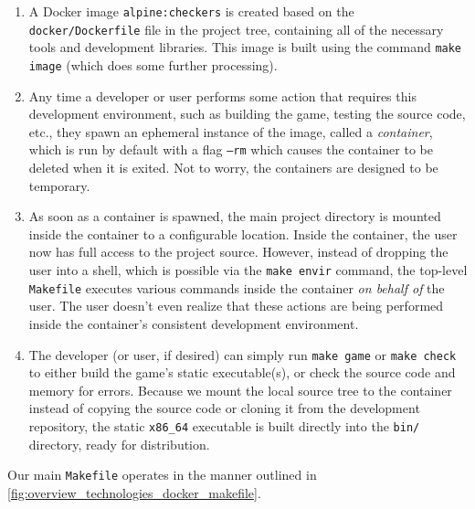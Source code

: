 \documentclass[letterpaper]{article}
\begin{document}
\begin{enumerate}
    \item A Docker image \texttt{alpine:checkers} is created
          based on the \texttt{docker/Dockerfile} file in the
          project tree, containing all of the necessary tools
          and development libraries. This image is built using
          the command \texttt{make image} (which does some
          further processing).
    \item Any time a developer or user performs some action
          that requires this development environment, such as
          building the game, testing the source code, etc.,
          they spawn an ephemeral instance of the image,
          called a \emph{container}, which is run by default
          with a flag \texttt{--rm} which causes the container
          to be deleted when it is exited. Not to worry, the
          containers are designed to be temporary.
    \item As soon as a container is spawned, the main project
          directory is mounted inside the container to a
          configurable location. Inside the container, the
          user now has full access to the project source.
          However, instead of dropping the user into a shell,
          which is possible via the \texttt{make envir}
          command, the top-level \texttt{Makefile} executes
          various commands inside the container
          \emph{on behalf of} the user. The user doesn't even
          realize that these actions are being performed inside
          the container's consistent development environment.
    \item The developer (or user, if desired) can simply run
          \texttt{make game} or \texttt{make check} to either
          build the game's static executable(s), or check the
          source code and memory for errors. Because we mount
          the local source tree to the container instead of
          copying the source code or cloning it from the
          development repository, the static \texttt{x86\_64}
          executable is built directly into the \texttt{bin/}
          directory, ready for distribution.
\end{enumerate}

Our main \texttt{Makefile} operates in the manner outlined in
\cref{fig:overview_technologies_docker_makefile}.
\end{document}
